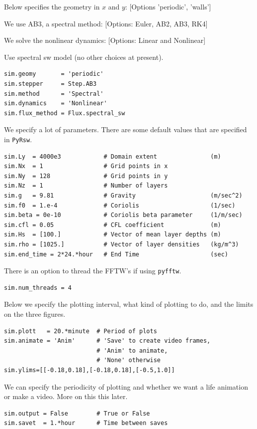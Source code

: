\documentclass[11pt]{article}
\begin{document}
\noindent  Below specifies the geometry in $x$ and $y$: [Options 'periodic', 'walls']

\noindent We use AB3, a spectral method: [Options: Euler, AB2, AB3, RK4]

\noindent We solve the nonlinear dynamics: [Options: Linear and Nonlinear]

\noindent  Use spectral sw model (no other choices at present).  

\begin{lstlisting}
sim.geomy       = 'periodic'
sim.stepper     = Step.AB3       
sim.method      = 'Spectral'       
sim.dynamics    = 'Nonlinear'    
sim.flux_method = Flux.spectral_sw
\end{lstlisting}

We specify a lot of parameters.  There are some default values that are specified in {\tt PyRsw}.
\begin{lstlisting}
sim.Ly  = 4000e3            # Domain extent               (m)
sim.Nx  = 1                 # Grid points in x
sim.Ny  = 128               # Grid points in y
sim.Nz  = 1                 # Number of layers
sim.g   = 9.81              # Gravity                     (m/sec^2)
sim.f0  = 1.e-4             # Coriolis                    (1/sec)
sim.beta = 0e-10            # Coriolis beta parameter     (1/m/sec)
sim.cfl = 0.05              # CFL coefficient             (m)
sim.Hs  = [100.]            # Vector of mean layer depths (m)
sim.rho = [1025.]           # Vector of layer densities   (kg/m^3)
sim.end_time = 2*24.*hour   # End Time                    (sec)
\end{lstlisting}

There is an option to thread the FFTW's if using {\tt pyfftw}.
\begin{lstlisting}
sim.num_threads = 4
\end{lstlisting}

Below we specify the plotting interval, what kind of plotting to do, and the limits on the three figures.
\begin{lstlisting}
sim.plott   = 20.*minute  # Period of plots
sim.animate = 'Anim'      # 'Save' to create video frames,
                          # 'Anim' to animate,
                          # 'None' otherwise
sim.ylims=[[-0.18,0.18],[-0.18,0.18],[-0.5,1.0]]
\end{lstlisting}

We can specify the periodicity of plotting and whether we want a life animation or make a video.  More on this this later.
\begin{lstlisting}
sim.output = False        # True or False
sim.savet  = 1.*hour      # Time between saves
\end{lstlisting}
\end{document}
